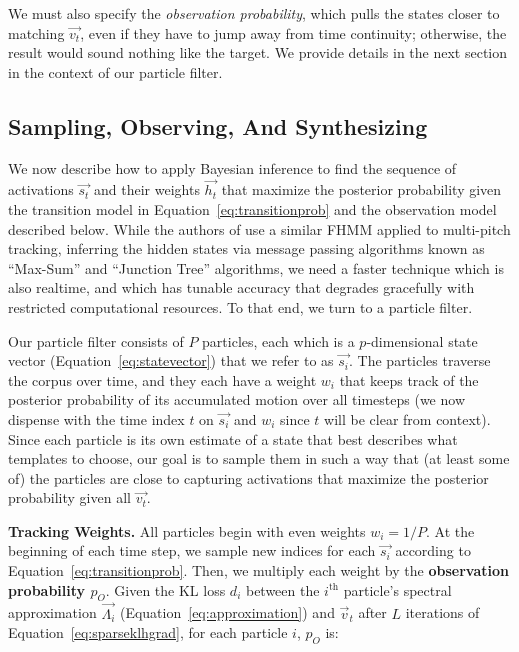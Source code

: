 \documentclass{article}
\begin{document}
    We must also specify the {\em observation probability}, which pulls the states closer to matching $\vec{v_t}$, even if they have to jump away from time continuity; otherwise, the result would sound nothing like the target. We provide details in the next section in the context of our particle filter.



\subsection{Sampling, Observing, And Synthesizing}
\label{sec:sampling}

We now describe how to apply Bayesian inference to find the sequence of activations $\vec{s_t}$ and their weights $\vec{h_t}$ that maximize the posterior probability given the transition model in Equation~\ref{eq:transitionprob} and the observation model described below.  While the authors of \cite{wohlmayr2010probabilistic} use a similar FHMM applied to multi-pitch tracking, inferring the hidden states via message passing algorithms known as ``Max-Sum'' \cite{kschischang2001factor} and ``Junction Tree'' \cite{jensen1996introduction} algorithms, we need a faster technique which is also realtime, and which has tunable accuracy that degrades gracefully with restricted computational resources.  To that end, we turn to a particle filter.

Our particle filter consists of $P$ particles, each which is a $p$-dimensional state vector (Equation~\ref{eq:statevector}) that we refer to as $\vec{s_i}$.  The particles traverse the corpus over time, and they each have a weight $w_i$ that keeps track of the posterior probability of its accumulated motion over all timesteps (we now dispense with the time index $t$ on $\vec{s_i}$ and $w_i$ since $t$ will be clear from context).  Since each particle is its own estimate of a state that best describes what templates to choose, our goal is to sample them in such a way that (at least some of) the particles are close to capturing activations that maximize the posterior probability given all $\vec{v_t}$.

\textbf{Tracking Weights.} All particles begin with even weights $w_i = 1/P$.  At the beginning of each time step, we sample new indices for each $\vec{s_i}$ according to Equation~\ref{eq:transitionprob}.  Then, we multiply each weight by the \textbf{observation probability $p_O$}.  Given the KL loss $d_i$ between the $i^{\text{th}}$ particle's spectral approximation $\vec{\Lambda_i}$ (Equation~\ref{eq:approximation}) and $\vec{v}_t$ after $L$ iterations of Equation~\ref{eq:sparseklhgrad}, for each particle $i$, $p_O$ is:
\end{document}
